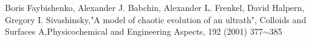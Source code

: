 \documentclass[autodetect-engine,dvipdfmx-if-dvi,ja=standard,a4paper,11pt]{bxjsarticle} %
\begin{document}
\begin{thebibliography}{9999}%
Boris Faybishenko, Alexander J. Babchin, Alexander L. Frenkel, David Halpern, Gregory I. Sivashinsky,"A
model of chaotic evolution of an ultrath", Colloids and Surfaces A,Physicochemical and Engineering Aspects,
192 (2001) 377$\sim$385
\end{thebibliography}

\end{document}
